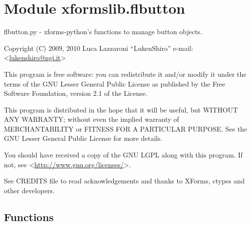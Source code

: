 %
%
%


\section{Module xformslib.flbutton}

    \label{xformslib:flbutton}

flbutton.py - xforms-python's functions to manage button objects.

Copyright (C) 2009, 2010  Luca Lazzaroni ``LukenShiro''
e-mail: <\href{mailto:lukenshiro@ngi.it}{lukenshiro@ngi.it}>

This program is free software: you can redistribute it and/or modify
it under the terms of the GNU Lesser General Public License as
published by the Free Software Foundation, version 2.1 of the License.

This program is distributed in the hope that it will be useful,
but WITHOUT ANY WARRANTY; without even the implied warranty of
MERCHANTABILITY or FITNESS FOR A PARTICULAR PURPOSE. See the
GNU Lesser General Public License for more details.

You should have received a copy of the GNU LGPL along with this
program. If not, see <\href{http://www.gnu.org/licenses/}{http://www.gnu.org/licenses/}>.

See CREDITS file to read acknowledgements and thanks to XForms,
ctypes and other developers.


  \subsection{Functions}

    \label{xformslib:flbutton:fl_add_roundbutton}

